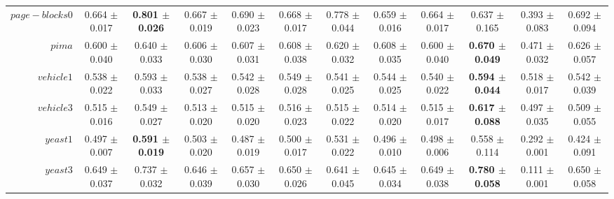 \begin{table}[!ht]
{\begin{tabular}{r c c c c c c c c c c c}
$page-blocks0$ & 0.664 $\pm$ 0.017 & \textbf{0.801 $\pm$ 0.026} & 0.667 $\pm$ 0.019 & 0.690 $\pm$ 0.023 & 0.668 $\pm$ 0.017 & 0.778 $\pm$ 0.044 & 0.659 $\pm$ 0.016 & 0.664 $\pm$ 0.017 & 0.637 $\pm$ 0.165 & 0.393 $\pm$ 0.083 & 0.692 $\pm$ 0.094 \\
$pima$ & 0.600 $\pm$ 0.040 & 0.640 $\pm$ 0.033 & 0.606 $\pm$ 0.030 & 0.607 $\pm$ 0.031 & 0.608 $\pm$ 0.038 & 0.620 $\pm$ 0.032 & 0.608 $\pm$ 0.035 & 0.600 $\pm$ 0.040 & \textbf{0.670 $\pm$ 0.049} & 0.471 $\pm$ 0.032 & 0.626 $\pm$ 0.057 \\
$vehicle1$ & 0.538 $\pm$ 0.022 & 0.593 $\pm$ 0.033 & 0.538 $\pm$ 0.027 & 0.542 $\pm$ 0.028 & 0.549 $\pm$ 0.028 & 0.541 $\pm$ 0.025 & 0.544 $\pm$ 0.025 & 0.540 $\pm$ 0.022 & \textbf{0.594 $\pm$ 0.044} & 0.518 $\pm$ 0.017 & 0.542 $\pm$ 0.039 \\
$vehicle3$ & 0.515 $\pm$ 0.016 & 0.549 $\pm$ 0.027 & 0.513 $\pm$ 0.020 & 0.515 $\pm$ 0.020 & 0.516 $\pm$ 0.023 & 0.515 $\pm$ 0.022 & 0.514 $\pm$ 0.020 & 0.515 $\pm$ 0.017 & \textbf{0.617 $\pm$ 0.088} & 0.497 $\pm$ 0.035 & 0.509 $\pm$ 0.055 \\
$yeast1$ & 0.497 $\pm$ 0.007 & \textbf{0.591 $\pm$ 0.019} & 0.503 $\pm$ 0.020 & 0.487 $\pm$ 0.019 & 0.500 $\pm$ 0.017 & 0.531 $\pm$ 0.022 & 0.496 $\pm$ 0.010 & 0.498 $\pm$ 0.006 & 0.558 $\pm$ 0.114 & 0.292 $\pm$ 0.001 & 0.424 $\pm$ 0.091 \\
$yeast3$ & 0.649 $\pm$ 0.037 & 0.737 $\pm$ 0.032 & 0.646 $\pm$ 0.039 & 0.657 $\pm$ 0.030 & 0.650 $\pm$ 0.026 & 0.641 $\pm$ 0.045 & 0.645 $\pm$ 0.034 & 0.649 $\pm$ 0.038 & \textbf{0.780 $\pm$ 0.058} & 0.111 $\pm$ 0.001 & 0.650 $\pm$ 0.058 \\
\end{tabular}}
\end{table}
